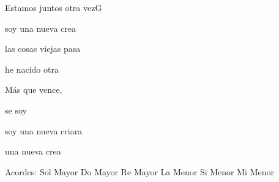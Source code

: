 \documentclass[12pt, spanish]{book}
\begin{document}
\begin{song}{Estamos juntos otra vez}{G}
\begin{SBOpGroup}
            soy una nueva crea

            las cosas viejas pasa

            he nacido otra 
        \end{SBOpGroup}
        \vskip 20pt
        \begin{SBOpGroup}
            Más que vence,

            se soy 

            soy una nueva criara

             una nueva crea
        \end{SBOpGroup}

        \ifChordBk
        \begin{SBOpGroup}
            Acordes:\break
            \upchord{\G}\qquad Sol Mayor \hfill
            \upchord{\C}\qquad Do Mayor \hfill\null\break
            \upchord{\D}\qquad Re Mayor \hfill
            \upchord{\Am}\qquad La Menor \hfill\null\break
            \upchord{\Bm}\qquad Si Menor \hfill
            \upchord{\Em}\qquad Mi Menor \hfill\null\break
        \end{SBOpGroup}
        \fi
    \end{song}

%
%
%
%
%
%
%
%
%
%
%
%
\end{document}
